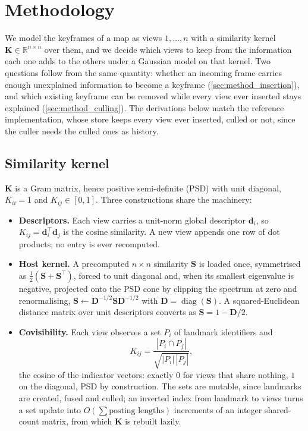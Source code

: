 \section{Methodology}
\label{sec:methodology}

We model the keyframes of a map as views $1,\dots,n$ with a similarity kernel $\mathbf{K}\in\mathbb{R}^{n\times n}$ over them, and we decide which views to keep from the information each one adds to the others under a Gaussian model on that kernel. Two questions follow from the same quantity: whether an incoming frame carries enough unexplained information to become a keyframe (\cref{sec:method_insertion}), and which existing keyframe can be removed while every view ever inserted stays explained (\cref{sec:method_culling}). The derivations below match the reference implementation, whose store keeps every view ever inserted, culled or not, since the culler needs the culled ones as history.

\subsection{Similarity kernel}
\label{sec:method_kernel}

$\mathbf{K}$ is a Gram matrix, hence positive semi-definite (PSD) with unit diagonal, $K_{ii}=1$ and $K_{ij}\in[0,1]$. Three constructions share the machinery:
\begin{itemize}
    \item \textbf{Descriptors.} Each view carries a unit-norm global descriptor $\mathbf{d}_i$, so $K_{ij}=\mathbf{d}_i^{\!\top}\mathbf{d}_j$ is the cosine similarity. A new view appends one row of dot products; no entry is ever recomputed.
    \item \textbf{Host kernel.} A precomputed $n\times n$ similarity $\mathbf{S}$ is loaded once, symmetrised as $\tfrac12(\mathbf{S}+\mathbf{S}^{\!\top})$, forced to unit diagonal and, when its smallest eigenvalue is negative, projected onto the PSD cone by clipping the spectrum at zero and renormalising, $\mathbf{S}\leftarrow\mathbf{D}^{-1/2}\mathbf{S}\mathbf{D}^{-1/2}$ with $\mathbf{D}=\operatorname{diag}(\mathbf{S})$. A squared-Euclidean distance matrix over unit descriptors converts as $\mathbf{S}=1-\mathbf{D}/2$.
    \item \textbf{Covisibility.} Each view observes a set $P_i$ of landmark identifiers and
    \begin{equation}
        K_{ij}=\frac{|P_i\cap P_j|}{\sqrt{|P_i|\,|P_j|}},
        \label{eq:covisibility_kernel}
    \end{equation}
    the cosine of the indicator vectors: exactly $0$ for views that share nothing, $1$ on the diagonal, PSD by construction. The sets are mutable, since landmarks are created, fused and culled; an inverted index from landmark to views turns a set update into $O(\sum \text{posting lengths})$ increments of an integer shared-count matrix, from which $\mathbf{K}$ is rebuilt lazily.
\end{itemize}

